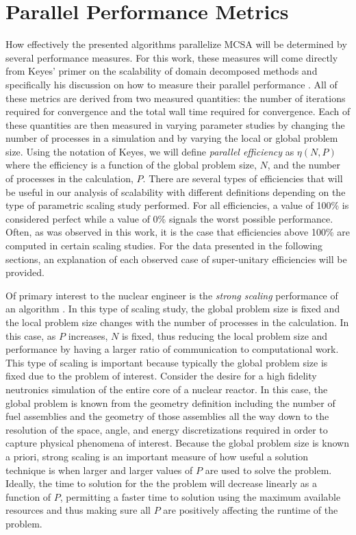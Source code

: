 \clearpage

\section{Parallel Performance Metrics\ }
\label{sec:parallel_performance_metrics}

How effectively the presented algorithms parallelize MCSA will be
determined by several performance measures. For this work, these
measures will come directly from Keyes' primer on the scalability of
domain decomposed methods and specifically his discussion on how to
measure their parallel performance \citep{keyes_how_1999}. All of
these metrics are derived from two measured quantities: the number of
iterations required for convergence and the total wall time required
for convergence. Each of these quantities are then measured in varying
parameter studies by changing the number of processes in a simulation
and by varying the local or global problem size. Using the notation of
Keyes, we will define \textit{parallel efficiency} as $\eta(N,P)$
where the efficiency is a function of the global problem size, $N$,
and the number of processes in the calculation, $P$. There are several
types of efficiencies that will be useful in our analysis of
scalability with different definitions depending on the type of
parametric scaling study performed. For all efficiencies, a value of
100\% is considered perfect while a value of 0\% signals the worst
possible performance. Often, as was observed in this work, it is the
case that efficiencies above 100\% are computed in certain scaling
studies. For the data presented in the following sections, an
explanation of each observed case of super-unitary efficiencies will
be provided.

Of primary interest to the nuclear engineer is the \textit{strong
  scaling} performance of an algorithm
\citep{siegel_analysis_2012}. In this type of scaling study, the
global problem size is fixed and the local problem size changes with
the number of processes in the calculation. In this case, as $P$
increases, $N$ is fixed, thus reducing the local problem size and
performance by having a larger ratio of communication to computational
work. This type of scaling is important because typically the global
problem size is fixed due to the problem of interest. Consider the
desire for a high fidelity neutronics simulation of the entire core of
a nuclear reactor. In this case, the global problem is known from the
geometry definition including the number of fuel assemblies and the
geometry of those assemblies all the way down to the resolution of the
space, angle, and energy discretizations required in order to capture
physical phenomena of interest. Because the global problem size is
known a priori, strong scaling is an important measure of how useful a
solution technique is when larger and larger values of $P$ are used to
solve the problem. Ideally, the time to solution for the the problem
will decrease linearly as a function of $P$, permitting a faster time
to solution using the maximum available resources and thus making sure
all $P$ are positively affecting the runtime of the problem.

